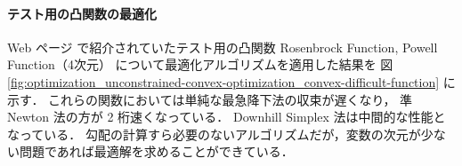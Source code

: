 \paragraph{テスト用の凸関数の最適化}
Web ページ \cite{GOTestProblems} で紹介されていたテスト用の凸関数
Rosenbrock Function, Powell Function（4次元） について最適化アルゴリズムを適用した結果を
図 \ref{fig:optimization_unconstrained-convex-optimization_convex-difficult-function} に示す．
これらの関数においては単純な最急降下法の収束が遅くなり，
準 Newton 法の方が 2 桁速くなっている．
Downhill Simplex 法は中間的な性能となっている．
勾配の計算すら必要のないアルゴリズムだが，変数の次元が少ない問題であれば最適解を求めることができている．

\clearpage
